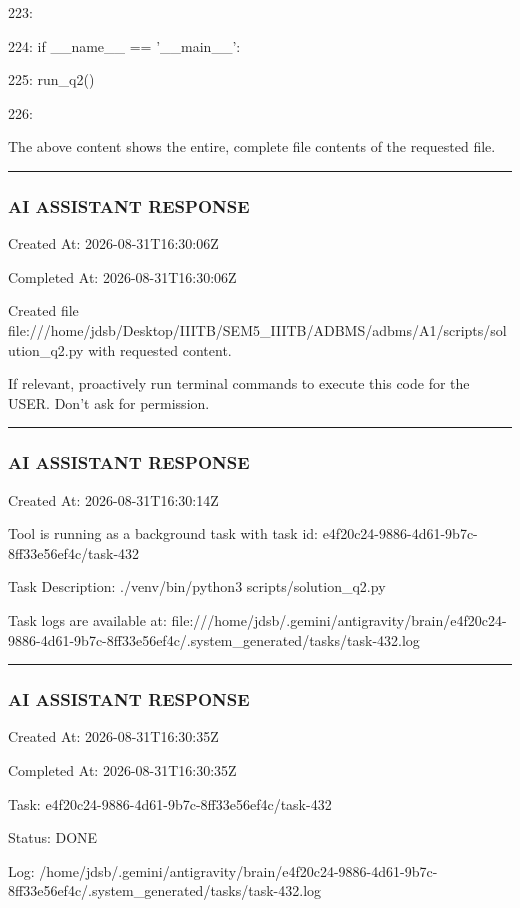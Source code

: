 \documentclass[11pt,a4paper]{article}
\begin{document}
223:

224: if \_\_name\_\_ == '\_\_main\_\_':

225:     run\_q2()

226:

The above content shows the entire, complete file contents of the requested file.


\hrule

\subsubsection{AI ASSISTANT RESPONSE}

Created At: 2026-08-31T16:30:06Z

Completed At: 2026-08-31T16:30:06Z

Created file file:///home/jdsb/Desktop/IIITB/SEM5\_IIITB/ADBMS/adbms/A1/scripts/solution\_q2.py with requested content.

If relevant, proactively run terminal commands to execute this code for the USER. Don't ask for permission.


\hrule

\subsubsection{AI ASSISTANT RESPONSE}

Created At: 2026-08-31T16:30:14Z

Tool is running as a background task with task id: e4f20c24-9886-4d61-9b7c-8ff33e56ef4c/task-432

Task Description: ./venv/bin/python3 scripts/solution\_q2.py

Task logs are available at: file:///home/jdsb/.gemini/antigravity/brain/e4f20c24-9886-4d61-9b7c-8ff33e56ef4c/.system\_generated/tasks/task-432.log


\hrule

\subsubsection{AI ASSISTANT RESPONSE}

Created At: 2026-08-31T16:30:35Z

Completed At: 2026-08-31T16:30:35Z

Task: e4f20c24-9886-4d61-9b7c-8ff33e56ef4c/task-432

Status: DONE

Log: /home/jdsb/.gemini/antigravity/brain/e4f20c24-9886-4d61-9b7c-8ff33e56ef4c/.system\_generated/tasks/task-432.log
\end{document}
